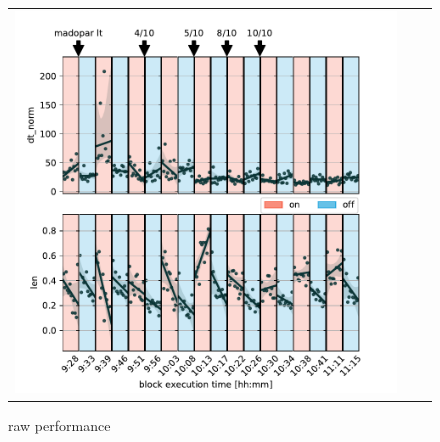 \documentclass[10pt,a4paper]{article}
\begin{document}
\begin{figure}
\begin{tabular}{ccc}
	\includegraphics[width=\behwidth\textwidth]{figures/behavioral/d4_scores_copyDraw}
\end{tabular}
\caption{raw performance}
\end{figure}
\end{document}
